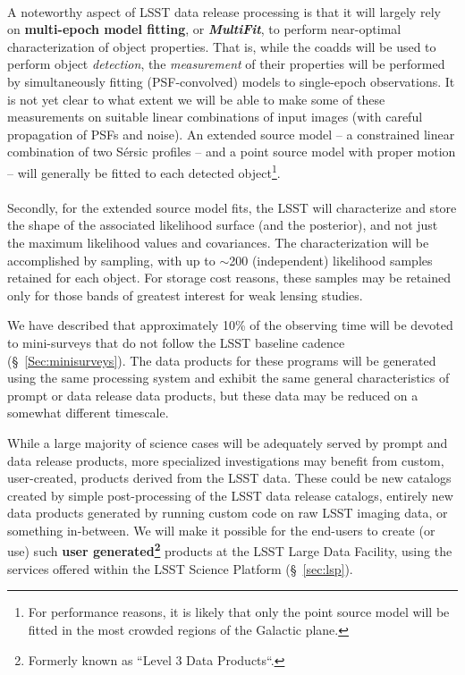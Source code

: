 \begin{itemize}
\\
A noteworthy aspect of LSST data release processing is that it will largely
rely on {\bf multi-epoch model fitting}, or {\bf \em MultiFit}, to
perform near-optimal characterization of object properties. That is,
while the coadds will be used to perform object {\em detection}, the
{\em measurement} of their properties will be performed by
simultaneously fitting (PSF-convolved) models to single-epoch
observations. It is not yet clear to what extent we will be able to make some of these
measurements on suitable linear combinations of input images (with careful propagation
of PSFs and noise).
An extended source model -- a constrained linear
combination of two S\'ersic profiles -- and a point source model with
proper motion -- will generally be
fitted to each detected object\footnote{For performance reasons, it is
  likely that only the point source model will be fitted in the most
  crowded regions of the Galactic plane.}.\\
\\
Secondly, for the extended source model fits, the LSST will
characterize and store the shape of the associated likelihood surface
(and the posterior), and not just the maximum likelihood values and
covariances. The characterization will be accomplished by sampling,
with up to $\sim$200 (independent) likelihood samples retained for
each object. For storage cost reasons, these samples
may be retained only for those bands of greatest interest for
weak lensing studies.

\end{itemize}

We have described that approximately 10\% of the observing time will
be devoted to mini-surveys that do not follow the LSST baseline
cadence (\S~\ref{Sec:minisurveys}). The data products for these
programs will be generated using the same processing system and
exhibit the same general characteristics of prompt or data release   data
products, but these data may be reduced on a somewhat different
timescale.

While a large majority of science cases will be adequately served by prompt
and data release products, more specialized investigations may benefit from
custom, user-created, products derived from the LSST data.  These could be
new catalogs created by simple post-processing of the LSST data release
catalogs, entirely new data products generated by running custom code on raw
LSST imaging data, or something in-between.  We will make it possible for the
end-users to create (or use) such {\bf user generated\footnote{Formerly known as
``Level 3 Data Products``.}} products at the LSST Large Data Facility,
using the services offered within the LSST Science Platform (\S~\ref{sec:lsp}).


